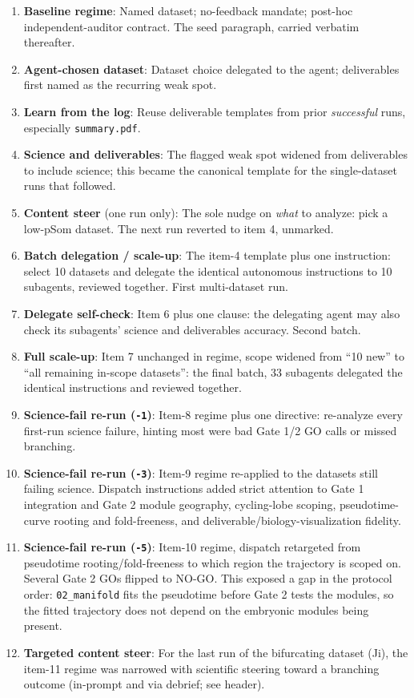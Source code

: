 \documentclass[11pt,a4paper]{article}
\providecommand{\tightlist}{\setlength{\itemsep}{0pt}\setlength{\parskip}{0pt}}
\begin{document}
\begin{enumerate}
\def\labelenumi{\arabic{enumi}.}
\tightlist
\item
  \textbf{Baseline regime}: Named dataset; no-feedback mandate;
  post-hoc independent-auditor contract. The seed paragraph, carried
  verbatim thereafter.
\item
  \textbf{Agent-chosen dataset}: Dataset choice delegated to the
  agent; deliverables first named as the recurring weak spot.
\item
  \textbf{Learn from the log}: Reuse deliverable templates from prior
  \emph{successful} runs, especially \texttt{summary.pdf}.
\item
  \textbf{Science and deliverables}: The flagged weak spot widened from
  deliverables to include science; this became the canonical template
  for the single-dataset runs that followed.
\item
  \textbf{Content steer} (one run only): The sole nudge on
  \emph{what} to analyze: pick a low-pSom dataset. The next run reverted
  to item 4, unmarked.
\item
  \textbf{Batch delegation / scale-up}: The item-4 template plus one
  instruction: select 10 datasets and delegate the identical autonomous
  instructions to 10 subagents, reviewed together. First multi-dataset
  run.
\item
  \textbf{Delegate self-check}: Item 6 plus one clause: the
  delegating agent may also check its subagents' science and deliverables
  accuracy. Second batch.
\item
  \textbf{Full scale-up}: Item 7 unchanged in regime, scope widened
  from ``10 new'' to ``all remaining in-scope datasets'': the final
  batch, 33 subagents delegated the identical instructions and reviewed
  together.
\item
  \textbf{Science-fail re-run (\texttt{-1})}: Item-8 regime plus one
  directive: re-analyze every first-run science failure, hinting most
  were bad Gate 1/2 GO calls or missed branching.
\item
  \textbf{Science-fail re-run (\texttt{-3})}: Item-9 regime
  re-applied to the datasets still failing science. Dispatch
  instructions added strict attention to Gate 1 integration and Gate 2
  module geography, cycling-lobe scoping, pseudotime-curve rooting and
  fold-freeness, and deliverable/biology-visualization fidelity.
\item
  \textbf{Science-fail re-run (\texttt{-5})}: Item-10 regime,
  dispatch retargeted from pseudotime rooting/fold-freeness to which
  region the trajectory is scoped on. Several Gate 2 GOs flipped to
  NO-GO. This exposed a gap in the protocol order: \texttt{02\_manifold}
  fits the pseudotime before Gate 2 tests the modules, so the fitted
  trajectory does not depend on the embryonic modules being present.
\item
  \textbf{Targeted content steer}: For the last run of the
  bifurcating dataset (Ji), the item-11 regime was narrowed with
  scientific steering toward a branching outcome (in-prompt and via
  debrief; see header).
\end{enumerate}
\end{document}
